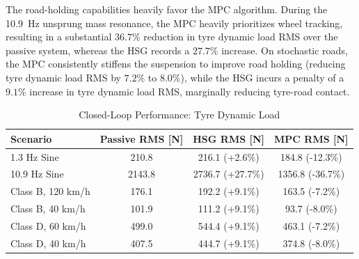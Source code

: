 The road-holding capabilities heavily favor the MPC algorithm. During the 10.9~Hz unsprung mass resonance, the MPC heavily prioritizes wheel tracking, resulting in a substantial $36.7\%$ reduction in tyre dynamic load RMS over the passive system, whereas the HSG records a $27.7\%$ increase. On stochastic roads, the MPC consistently stiffens the suspension to improve road holding (reducing tyre dynamic load RMS by $7.2\%$ to $8.0\%$), while the HSG incurs a penalty of a $9.1\%$ increase in tyre dynamic load RMS, marginally reducing tyre-road contact.

\begin{table}[H]
    \centering
    \caption{Closed-Loop Performance: Tyre Dynamic Load}
    \label{tab:cl_rh_metrics}
    \renewcommand{\arraystretch}{1.2}
    \begin{tabular}{lccc}
        \toprule
        \textbf{Scenario} & \textbf{Passive RMS} [N] & \textbf{HSG RMS} [N] & \textbf{MPC RMS} [N] \\
        \midrule
        1.3 Hz Sine      & 210.8  & 216.1   (+2.6\%)  & 184.8   (-12.3\%) \\
        10.9 Hz Sine     & 2143.8 & 2736.7  (+27.7\%) & 1356.8  (-36.7\%) \\
        Class B, 120 km/h& 176.1  & 192.2   (+9.1\%)  & 163.5   (-7.2\%)  \\
        Class B, 40 km/h & 101.9  & 111.2   (+9.1\%)  & 93.7    (-8.0\%)  \\
        Class D, 60 km/h & 499.0  & 544.4   (+9.1\%)  & 463.1   (-7.2\%)  \\
        Class D, 40 km/h & 407.5  & 444.7   (+9.1\%)  & 374.8   (-8.0\%)  \\
        \bottomrule
    \end{tabular}
\end{table}

